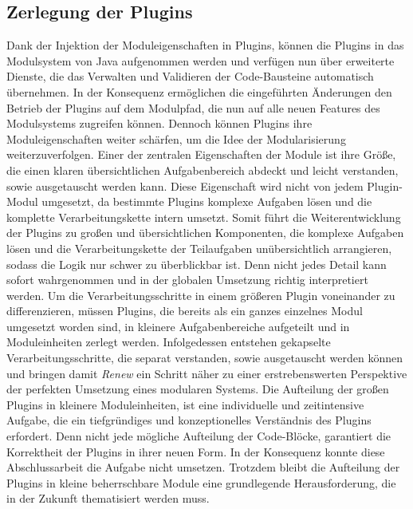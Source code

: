  \subsection*{Zerlegung der Plugins}
	Dank der Injektion der Moduleigenschaften in Plugins, können die Plugins in das Modulsystem von Java aufgenommen werden und verfügen nun über erweiterte Dienste, die das Verwalten und Validieren der Code-Bausteine automatisch übernehmen. In der Konsequenz ermöglichen die eingeführten Änderungen den Betrieb der Plugins auf dem Modulpfad, die nun auf alle neuen Features des Modulsystems zugreifen können. Dennoch können Plugins ihre Moduleigenschaften weiter schärfen, um die Idee der Modularisierung weiterzuverfolgen. \newline
	Einer der zentralen Eigenschaften der Module ist ihre Größe, die einen klaren übersichtlichen Aufgabenbereich abdeckt und leicht verstanden, sowie ausgetauscht werden kann. Diese Eigenschaft wird nicht von jedem Plugin-Modul umgesetzt, da bestimmte Plugins komplexe Aufgaben lösen und die komplette Verarbeitungskette intern umsetzt. Somit führt die Weiterentwicklung der Plugins zu großen und übersichtlichen Komponenten, die komplexe Aufgaben lösen und die Verarbeitungskette der Teilaufgaben unübersichtlich arrangieren, sodass die Logik nur schwer zu überblickbar ist. Denn nicht jedes Detail kann sofort wahrgenommen und in der globalen Umsetzung richtig interpretiert werden.\newline
	Um die Verarbeitungsschritte in einem größeren Plugin voneinander zu differenzieren, müssen Plugins, die bereits als ein ganzes einzelnes Modul umgesetzt worden sind, in kleinere Aufgabenbereiche aufgeteilt und in Moduleinheiten zerlegt werden. Infolgedessen entstehen gekapselte Verarbeitungsschritte, die separat verstanden, sowie ausgetauscht werden können und bringen damit  \textit{Renew} ein Schritt näher zu einer erstrebenswerten Perspektive der perfekten Umsetzung eines modularen Systems. \newline
	Die Aufteilung der großen Plugins in kleinere Moduleinheiten, ist eine individuelle und zeitintensive Aufgabe, die ein tiefgründiges und konzeptionelles Verständnis des Plugins erfordert. Denn nicht jede mögliche Aufteilung der Code-Blöcke, garantiert die Korrektheit der Plugins in ihrer neuen Form. \newline
	In der Konsequenz konnte diese Abschlussarbeit die Aufgabe nicht umsetzen. Trotzdem bleibt die Aufteilung der Plugins in kleine beherrschbare Module eine grundlegende Herausforderung, die in der Zukunft thematisiert werden muss. 

